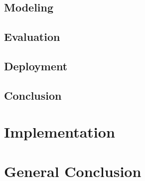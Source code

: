 \documentclass[12pt]{report}
\begin{document}
\section{Modeling} %

\section{Evaluation} %

\section{Deployment} %


\section*{Conclusion}





\setcounter{chapter}{5} 
\chapter{Implementation} %
\label{chap:implementation}


\pagebreak  %






\newpage

\chapter*{General Conclusion}

\end{document}
